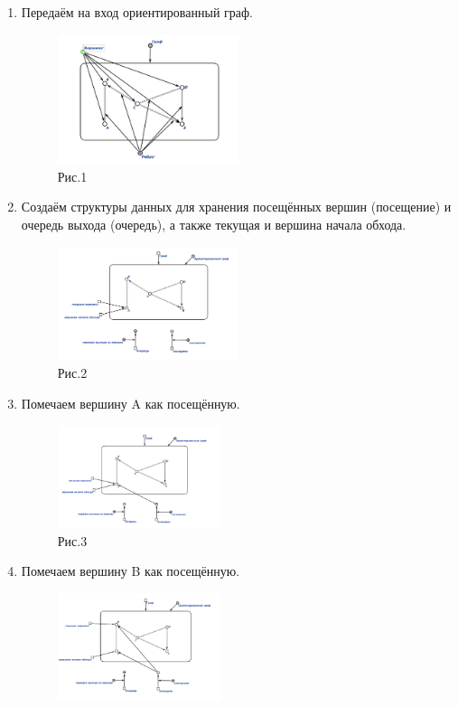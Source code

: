 \documentclass[10pt,a4paper,twocolumn]{article}
\begin{document}
\begin{enumerate}
	\item Передаём на вход ориентированный граф.
	\begin{figure}[h!]
		\includegraphics[width=0.5\textwidth]{img/1.png}
		\caption{Рис.1}
	\end{figure}
	\item Создаём структуры данных для хранения посещённых вершин (посещение) и очередь выхода (очередь), а также текущая и вершина начала обхода.
	\begin{figure}[h!]
		\includegraphics[width=0.5\textwidth]{img/2.png}
		\caption{Рис.2}
	\end{figure}
	\item Помечаем вершину A как посещённую.
    \begin{figure}[h]
		\includegraphics[width=0.45\textwidth]{img/3.png}
		\caption{Рис.3}
	\end{figure}
    \newpage
	\item Помечаем вершину B как посещённую.
	\begin{figure}[h]
		\includegraphics[width=0.45\textwidth]{img/4.png}

\end{figure}
\end{enumerate}
\end{document}

